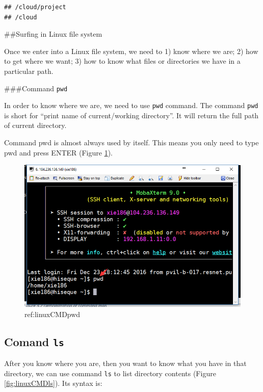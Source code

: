 \documentclass[]{book}
\begin{document}
\begin{verbatim}
## /cloud/project
## /cloud
\end{verbatim}

\#\#Surfing in Linux file system

Once we enter into a Linux file system, we need to 1) know where we are; 2) how to get where we want; 3) how to know what files or directories we have in a particular path.

\#\#\#Command \texttt{pwd}

In order to know where we are, we need to use \texttt{pwd} command. The command \texttt{pwd} is short for ``print name of current/working directory''. It will return the full path of current directory.

Command pwd is almost always used by itself. This means you only need to type pwd and press ENTER (Figure \ref{fig:linuxCMDpwd}).



\begin{figure}

{\centering \includegraphics[width=0.8\linewidth]{figures/linuxCMDpwd} 

}

\caption{ref:linuxCMDpwd}\label{fig:linuxCMDpwd}
\end{figure}

\hypertarget{comand-ls}{%
\subsection{\texorpdfstring{Comand \texttt{ls}}{Comand ls}}\label{comand-ls}}

After you know where you are, then you want to know what you have in that
directory, we can use command \texttt{ls} to list directory contents (Figure \ref{fig:linuxCMDls}). Its syntax is:
\end{document}
